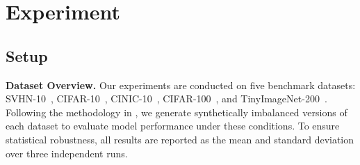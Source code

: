 \section{Experiment} \label{sec:experiments}

\subsection{Setup}
\textbf{Dataset Overview.}
Our experiments are conducted on five benchmark datasets: SVHN-10~\cite{netzer2011reading}, CIFAR-10~\cite{krizhevsky2009learning}, CINIC-10~\cite{darlow2018cinic}, CIFAR-100~\cite{krizhevsky2009learning}, and TinyImageNet-200~\cite{le2015tiny}. Following the methodology in \cite{cao2019learning}, we generate synthetically imbalanced versions of each dataset to evaluate model performance under these conditions. To ensure statistical robustness, all results are reported as the mean and standard deviation over three independent runs.

